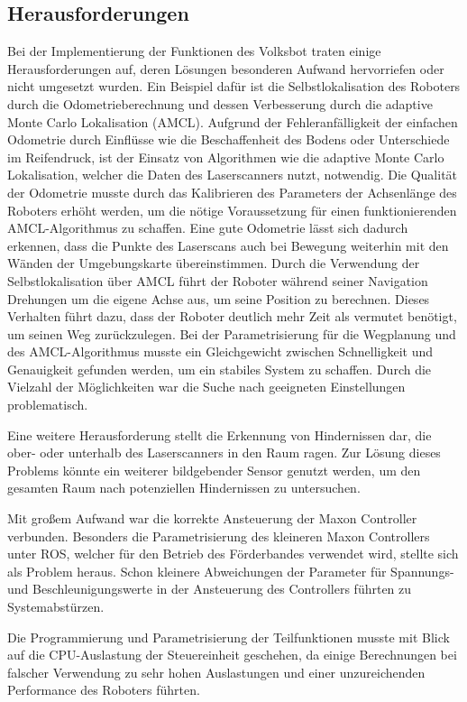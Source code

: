 \subsection{Herausforderungen}

Bei der Implementierung der Funktionen des Volksbot traten einige Herausforderungen auf, deren Lösungen besonderen Aufwand hervorriefen oder nicht umgesetzt wurden. Ein Beispiel dafür ist die Selbstlokalisation des Roboters durch die Odometrieberechnung und dessen Verbesserung durch die adaptive Monte Carlo Lokalisation (AMCL). Aufgrund der Fehleranfälligkeit der einfachen Odometrie durch Einflüsse wie die Beschaffenheit des Bodens oder Unterschiede im Reifendruck, ist der Einsatz von Algorithmen wie die adaptive Monte Carlo Lokalisation, welcher die Daten des Laserscanners nutzt, notwendig.  Die Qualität der Odometrie musste durch das Kalibrieren des Parameters der Achsenlänge des Roboters erhöht werden, um die nötige Voraussetzung für einen funktionierenden AMCL-Algorithmus zu schaffen. Eine gute Odometrie lässt sich dadurch erkennen, dass die Punkte des Laserscans auch bei Bewegung weiterhin mit den Wänden der Umgebungskarte übereinstimmen. Durch die Verwendung der Selbstlokalisation über AMCL führt der Roboter während seiner Navigation Drehungen um die eigene Achse aus, um seine Position zu berechnen. Dieses Verhalten führt dazu, dass der Roboter deutlich mehr Zeit als vermutet benötigt, um seinen Weg zurückzulegen. Bei der Parametrisierung für die Wegplanung und des AMCL-Algorithmus musste ein Gleichgewicht zwischen Schnelligkeit und Genauigkeit gefunden werden, um ein stabiles System zu schaffen. Durch die Vielzahl der Möglichkeiten war die Suche nach geeigneten Einstellungen problematisch.  

Eine weitere Herausforderung stellt die Erkennung von Hindernissen dar, die ober- oder unterhalb des Laserscanners in den Raum ragen. Zur Lösung dieses Problems könnte ein weiterer bildgebender Sensor genutzt werden, um den gesamten Raum nach potenziellen Hindernissen zu untersuchen.

Mit großem Aufwand war die korrekte Ansteuerung der Maxon Controller verbunden. Besonders die Parametrisierung des kleineren Maxon Controllers unter ROS, welcher für den Betrieb des Förderbandes verwendet wird, stellte sich als Problem heraus. Schon kleinere Abweichungen der Parameter für Spannungs- und Beschleunigungswerte in der Ansteuerung des Controllers führten zu Systemabstürzen.
 
Die Programmierung und Parametrisierung der Teilfunktionen musste mit Blick auf
die CPU-Auslastung der Steuereinheit geschehen, da einige Berechnungen bei falscher
Verwendung zu sehr hohen Auslastungen und einer unzureichenden Performance des
Roboters führten.
